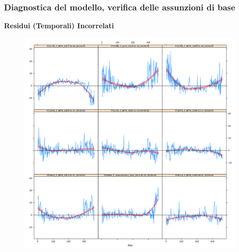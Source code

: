 \documentclass{beamer}
\begin{document}
\begin{frame}
\frametitle{Diagnostica del modello, verifica delle assunzioni di base}
\centerline{\textbf{Residui (Temporali) Incorrelati}}
\begin{figure}
\includegraphics[height=0.6\textwidth]{residuiTemporali_modello_1gennaio2015.png}
\end{figure}
\end{frame}
\end{document}
